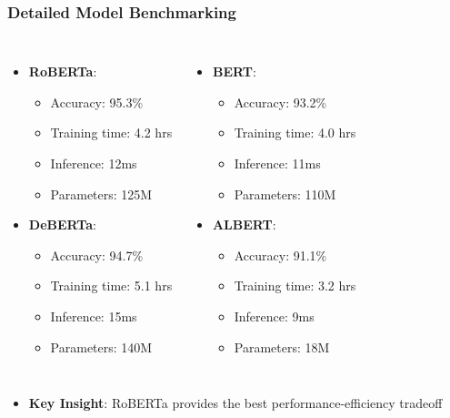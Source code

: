 \begin{frame}
\frametitle{Detailed Model Benchmarking}
\begin{columns}
\begin{itemize}
    \item \textbf{RoBERTa}:
    \begin{itemize}
        \item Accuracy: 95.3\%
        \item Training time: 4.2 hrs
        \item Inference: 12ms
        \item Parameters: 125M
    \end{itemize}
    \item \textbf{DeBERTa}:
    \begin{itemize}
        \item Accuracy: 94.7\%
        \item Training time: 5.1 hrs
        \item Inference: 15ms
        \item Parameters: 140M
    \end{itemize}
\end{itemize}

\begin{itemize}
    \item \textbf{BERT}:
    \begin{itemize}
        \item Accuracy: 93.2\%
        \item Training time: 4.0 hrs
        \item Inference: 11ms
        \item Parameters: 110M
    \end{itemize}
    \item \textbf{ALBERT}:
    \begin{itemize}
        \item Accuracy: 91.1\%
        \item Training time: 3.2 hrs
        \item Inference: 9ms
        \item Parameters: 18M
    \end{itemize}
\end{itemize}
\end{columns}

\begin{itemize}
    \item \textbf{Key Insight}: RoBERTa provides the best performance-efficiency tradeoff
\end{itemize}
\end{frame}

